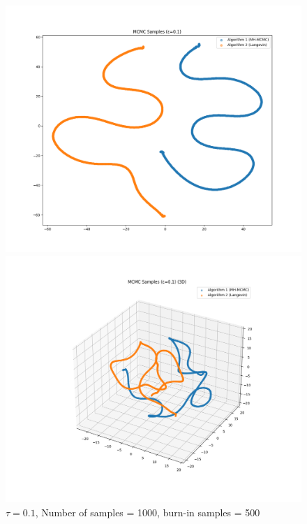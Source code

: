 \documentclass[a4paper,12pt]{article}
\begin{document}
\begin{figure}[H]
  \centering
  \begin{minipage}{0.48\textwidth}
    \includegraphics[width=\linewidth]{TASK-0-1/images/samples_eps0.1_n1000_burn500_tsne_2d.png}
  \end{minipage}
  \hfill
  \begin{minipage}{0.48\textwidth}
    \includegraphics[width=\linewidth]{TASK-0-1/images/samples_eps0.1_n1000_burn500_tsne_3d.png}
  \end{minipage}
  \caption{$\tau = 0.1$, Number of samples = 1000, burn-in samples = 500}
\end{figure}
\end{document}
